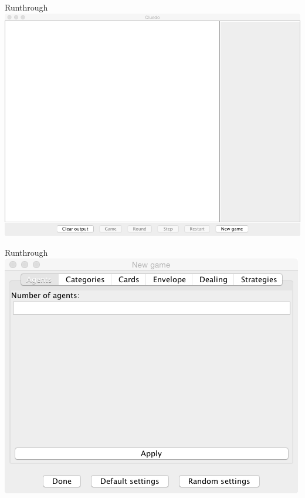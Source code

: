 \begin{frame}{Runthrough}
    \centering
    \includegraphics[height=0.8\textheight]{images/Empty}
\end{frame}

\begin{frame}{Runthrough}
    \centering
    \includegraphics[height=0.8\textheight]{images/NewGame}
\end{frame}

